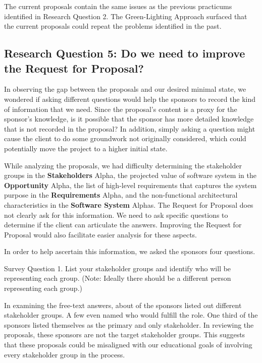 \documentclass[conference]{IEEEtran}
\begin{document}
The current proposals contain the same issues as the previous practicums identified in Research Question 2. The Green-Lighting Approach surfaced that the current proposals could repeat the problems identified in the past.


\subsection{Research Question 5: Do we need to
improve the Request for Proposal?}

In observing the gap between the proposals and our desired minimal
state, we wondered if asking different questions would help the sponsors
to record the kind of information that we need. Since the proposal's
content is a proxy for the sponsor's knowledge, is it possible that the
sponsor has more detailed knowledge that is not recorded in the proposal?
In addition, simply asking a question might cause the client to do some
groundwork not originally considered, which could potentially move the
project to a higher initial state. 

While analyzing the proposals, we had difficulty determining the stakeholder groups in the
 \textbf{Stakeholders} Alpha, the projected value of software system in the
 \textbf{Opportunity} Alpha, the list of high-level requirements that captures
the system purpose in the \textbf{Requirements} Alpha, and the non-functional
architectural characteristics in the \textbf{Software System} Alphas. The
Request for Proposal does not clearly ask for this information. We need
to ask specific questions to determine if the client can articulate the
answers. Improving the Request for Proposal would also facilitate
easier analysis for these aspects.

In order to help ascertain this information, we asked the sponsors four
questions.

{Survey Question 1. List your stakeholder groups and identify who will be
representing each group. (Note: Ideally there should be a different
person representing each group.)}

In examining the free-text answers, about  of the sponsors listed
out different stakeholder groups. A few even named who would fulfill the
role. One third of the sponsors listed themselves as the primary and
only stakeholder. In reviewing the proposals, these sponsors are not the
target stakeholder groups. This suggests that these proposals could be
misaligned with our educational goals of involving every stakeholder
group in the process.
\end{document}
